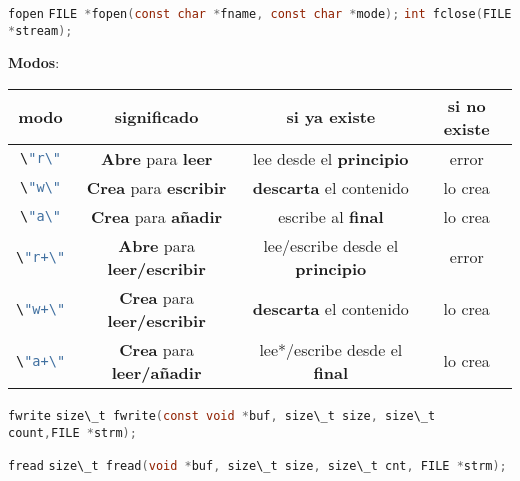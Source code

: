\documentclass{mybeamer}
\begin{document}
\def\lsti[#1]{\lstinline[language=C, basicstyle=\scriptsize]|\"#1\"|}
\begin{framesubsec}{\texttt{fopen}}
	\lstinline[language=C]|FILE *fopen(const char *fname, const char *mode);|
	\lstinline[language=C]|int fclose(FILE *stream);|
	\vspace{2em}

	\textbf{Modos}:
	\vspace{-1em}
	\begin{table}[]
	\scriptsize
	\centering
	\begin{tabular}{|c|c|c|c|}
	\hline
	modo      & significado                               & si ya existe                            & si no existe \\ \hline
	\lsti[r]  & \textbf{Abre} para \textbf{leer}          & lee desde el \textbf{principio}         & error        \\ \hline
	\lsti[w]  & \textbf{Crea} para \textbf{escribir}      & \textbf{descarta} el contenido          & lo crea      \\ \hline
	\lsti[a]  & \textbf{Crea} para \textbf{añadir}        & escribe al \textbf{final}               & lo crea      \\ \hline
	\lsti[r+] & \textbf{Abre} para \textbf{leer/escribir} & lee/escribe desde el \textbf{principio} & error        \\ \hline
	\lsti[w+] & \textbf{Crea} para \textbf{leer/escribir} & \textbf{descarta} el contenido          & lo crea      \\ \hline
	\lsti[a+] & \textbf{Crea} para \textbf{leer/añadir}   & lee*/escribe desde el \textbf{final}    & lo crea      \\ \hline
	\end{tabular}
	\end{table}
\end{framesubsec}

\begin{framesubsec}{\texttt{fwrite}}
	\lstinline[language=C, basicstyle=\footnotesize]|size\_t fwrite(const void *buf, size\_t size, size\_t count,FILE *strm);|
	\vspace{1em}

	
\end{framesubsec}

\begin{framesubsec}{\texttt{fread}}
	\lstinline[language=C, basicstyle=\footnotesize]|size\_t fread(void *buf, size\_t size, size\_t cnt, FILE *strm);|
	\vspace{1em}

	
\end{framesubsec}
\end{document}

